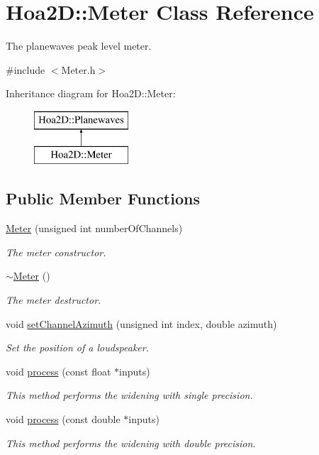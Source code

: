 \hypertarget{class_hoa2_d_1_1_meter}{\section{Hoa2\-D\-:\-:Meter Class Reference}
\label{class_hoa2_d_1_1_meter}
}


The planewaves peak level meter.  




{\ttfamily \#include $<$Meter.\-h$>$}

Inheritance diagram for Hoa2\-D\-:\-:Meter\-:\begin{figure}[H]
\begin{center}
\leavevmode
\includegraphics[height=2.000000cm]{class_hoa2_d_1_1_meter}
\end{center}
\end{figure}
\subsection*{Public Member Functions}
\begin{DoxyCompactItemize}
\item 
\hyperlink{class_hoa2_d_1_1_meter_a14d0584c4d3cd7fbfcbe73b7f9b072ce}{Meter} (unsigned int number\-Of\-Channels)
\begin{DoxyCompactList}\small\item\em The meter constructor. \end{DoxyCompactList}\item 
\hyperlink{class_hoa2_d_1_1_meter_a48276da266f600f4d24db748ff4ca046}{$\sim$\-Meter} ()
\begin{DoxyCompactList}\small\item\em The meter destructor. \end{DoxyCompactList}\item 
void \hyperlink{class_hoa2_d_1_1_meter_a4170ee9ed709f6d6bfecd30591ac8347}{set\-Channel\-Azimuth} (unsigned int index, double azimuth)
\begin{DoxyCompactList}\small\item\em Set the position of a loudspeaker. \end{DoxyCompactList}\item 
void \hyperlink{class_hoa2_d_1_1_meter_a1b05d443d17a910e7e9cc7b3f81badc6}{process} (const float $\ast$inputs)
\begin{DoxyCompactList}\small\item\em This method performs the widening with single precision. \end{DoxyCompactList}\item 
void \hyperlink{class_hoa2_d_1_1_meter_af523ed430333d4b861b117bda0bc6068}{process} (const double $\ast$inputs)
\begin{DoxyCompactList}\small\item\em This method performs the widening with double precision. \end{DoxyCompactList}\end{DoxyCompactItemize}

